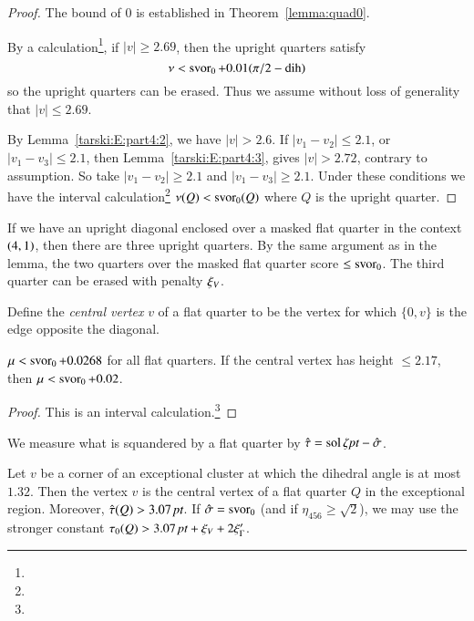 \begin{proof}
The bound of $0$ is established in Theorem~\ref{lemma:quad0}.

By a calculation\footnote{}, if $|v|\ge 2.69$,
then the upright quarters satisfy
    $$\nu < \operatorname{svor}_0 + 0.01 (\pi/2-\operatorname{dih})$$
so the upright quarters can be erased.  Thus we assume without
loss of generality that $|v|\le 2.69$.

By Lemma~\ref{tarski:E:part4:2}, we have $|v|>2.6$.
If $|v_1-v_2|\le 2.1$,  or $|v_1-v_3|\le 2.1$, then
Lemma~\ref{tarski:E:part4:3}, gives $|v|>2.72$, 
 contrary to assumption.  So take $|v_1-v_2|\ge 2.1$ and
$|v_1-v_3|\ge2.1$. Under these conditions we have the interval
calculation\footnote{} %
  $\nu(Q) < \operatorname{svor}_0(Q)$ where $Q$ is the upright quarter.
\end{proof}

\begin{remark}
\label{remark:3rd-quarter} If we have an upright diagonal enclosed
over a masked flat quarter in the context $\relax(4,1)$, then there are
three upright quarters.  By the same argument as in the lemma, the
two quarters over the masked flat quarter score $\le\operatorname{svor}_0$. The
third quarter can be erased with penalty $\xi_V$.
\end{remark}

Define the {\it central vertex\/} $v$ of a flat quarter to be the
vertex for which $\{0,v\}$ is the edge opposite the diagonal.


\begin{lemma}
$\mu < \operatorname{svor}_0 +0.0268$ for all flat quarters. If the central
vertex has height $\le2.17$, then $\mu<\operatorname{svor}_0+0.02$.
\end{lemma}

\begin{proof}
This is an interval calculation.\footnote{} %
\end{proof}


We  measure what is squandered by a flat quarter by $\hat\tau =
\operatorname{sol}\zeta\hbox{\it pt} - \hat\sigma$.

\begin{lemma}\label{lemma:1.32}
Let $v$ be a corner of an exceptional cluster at which the
dihedral angle is at most $1.32$. Then the vertex $v$ is the
central vertex of a flat quarter $Q$ in the exceptional region.
Moreover, $\hat\tau(Q)>3.07\,\hbox{\it pt}$. If $\hat\sigma=\operatorname{svor}_0$ (and if
$\eta_{456}\ge\sqrt2$), we may use the stronger constant
$\tau_0(Q)> 3.07\,\hbox{\it pt}+\xi_V+2\xi_\Gamma'$.
\end{lemma}


